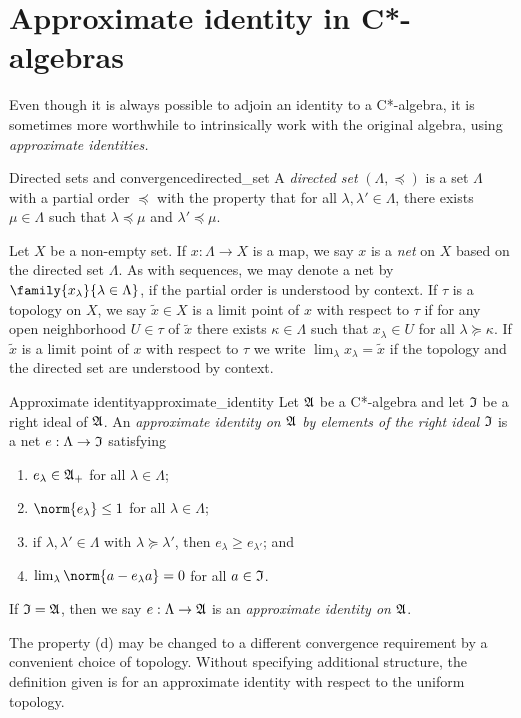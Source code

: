 \section{Approximate identity in C*-algebras}
Even though it is always possible to adjoin an identity to a C*-algebra, it is sometimes more worthwhile to intrinsically work with the original algebra, using \emph{approximate identities.}

\begin{definition}{Directed sets and convergence}{directed_set}
    A \emph{directed set} \((\Lambda, \preceq)\) is a set \(\Lambda\) with a partial order \(\preceq\) with the property that for all \(\lambda, \lambda' \in \Lambda\), there exists \(\mu \in \Lambda\) such that \(\lambda \preceq \mu\) and \(\lambda' \preceq \mu\).

    Let \(X\) be a non-empty set. If \(x : \Lambda \to X\) is a map, we say \(x\) is a \emph{net} on \(X\) based on the directed set \(\Lambda\). As with sequences, we may denote a net by \(\family{x_{\lambda}}{\lambda \in \Lambda}\), if the partial order is understood by context. If \(\tau\) is a topology on \(X\), we say \(\tilde{x} \in X\) is a limit point of \(x\) with respect to \(\tau\) if for any open neighborhood \(U \in \tau\) of \(\tilde{x}\) there exists \(\kappa\in \Lambda\) such that \(x_{\lambda} \in U\) for all \(\lambda \succeq \kappa\). If \(\tilde{x}\) is a limit point of \(x\) with respect to \(\tau\) we write \(\lim_{\lambda} x_{\lambda} = \tilde{x}\) if the topology and the directed set are understood by context.
\end{definition}

\begin{definition}{Approximate identity}{approximate_identity}
    Let \(\mathfrak{A}\) be a C*-algebra and let \(\mathfrak{I}\) be a right ideal of \(\mathfrak{A}\). An \emph{approximate identity on \(\mathfrak{A}\) by elements of the right ideal \(\mathfrak{I}\)} is a net \(e : \Lambda \to \mathfrak{I}\) satisfying
    \begin{enumerate}[label=(\alph*)]
        \item \(e_{\lambda} \in \mathfrak{A}_+\) for all \(\lambda \in \Lambda\);
        \item \(\norm{e_{\lambda}}\leq 1\) for all \(\lambda \in \Lambda\);
        \item if \(\lambda, \lambda' \in \Lambda\) with \(\lambda \succeq \lambda'\), then \(e_{\lambda} \geq e_{\lambda'}\); and
        \item \(\lim_{\lambda}{\norm{a - e_{\lambda}a}}= 0\) for all \(a \in \mathfrak{I}\).
    \end{enumerate}
    If \(\mathfrak{I} = \mathfrak{A}\), then we say \(e : \Lambda \to \mathfrak{A}\) is an \emph{approximate identity on \(\mathfrak{A}\)}.
\end{definition}
\begin{remark}
    The property (d) may be changed to a different convergence requirement by a convenient choice of topology. Without specifying additional structure, the definition given is for an approximate identity with respect to the uniform topology.
\end{remark}

